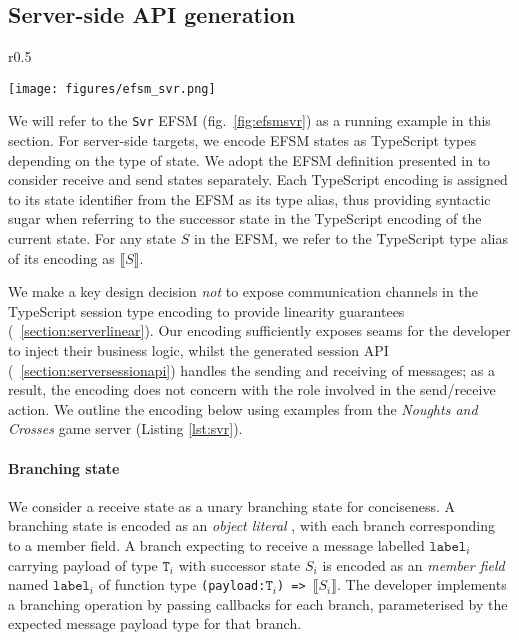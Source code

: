 \documentclass[submission,copyright,creativecommons]{eptcs}
\newcommand{\sectionref}[1]{\textsection~\ref{#1}}
\begin{document}
\subsection{Server-side API generation}
\label{section:server}

\begin{wrapfigure}{r}{0.5\textwidth}
  \begin{center}
    \texttt{[image: figures/efsm\_svr.png]}
  \end{center}

  \label{fig:efsmsvr}
\end{wrapfigure}


We will refer to the \texttt{Svr} EFSM (fig.~\ref{fig:efsmsvr}) as a
running example in this section. For server-side targets, we encode
EFSM states as TypeScript types depending on the type of state. We
adopt the EFSM definition presented in \cite{Hybrid2016} to consider
receive and send states separately. Each TypeScript encoding is
assigned to its state identifier from the EFSM as its type alias, thus providing syntactic sugar when referring to the successor state in the TypeScript encoding of the current state. For any state $S$ in the EFSM, we refer to the TypeScript type alias of its encoding as $\llbracket S \rrbracket$. 

We make a key design decision \textit{not} to expose communication channels in the TypeScript session type encoding to provide linearity guarantees (\sectionref{section:serverlinear}). Our encoding sufficiently exposes seams for the developer to inject their business logic, whilst the generated session API (\sectionref{section:serversessionapi}) handles the sending and receiving of messages; as a result, the encoding does not concern with the role involved in the send/receive action. We outline the encoding below using examples from the \textit{Noughts and Crosses} game server (Listing \ref{lst:svr}).

\paragraph{Branching state} We consider a receive state as a unary branching state for conciseness. A branching state is encoded as an \textit{object literal} \cite{TypeScriptSpec}, with each branch corresponding to a member field. A branch expecting to receive a message labelled $\texttt{label}_i$ carrying payload of type $\texttt{T}_i$ with successor state $S_i$ is encoded as an \textit{member field} named $\texttt{label}_i$ of function type \texttt{(payload:$\texttt{T}_i$) => $\llbracket S_i \rrbracket$}. The developer implements a branching operation by passing callbacks for each branch, parameterised by the expected message payload type for that branch.
\end{document}
